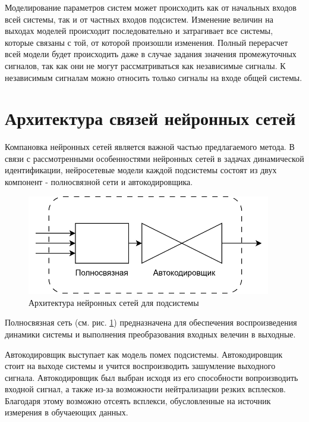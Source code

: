 Моделирование параметров систем может происходить как от начальных входов всей
системы, так и от частных входов подсистем. Изменение величин на выходах моделей
происходит последовательно и затрагивает все системы, которые связаны с той, от
которой произошли изменения. Полный перерасчет всей модели будет происходить
даже в случае задания значения промежуточных сигналов, так как они не могут
рассматриваться как независимые сигналы. К независимым сигналам можно относить
только сигналы на входе общей системы.

\section{Архитектура связей нейронных сетей}

Компановка нейронных сетей является важной частью предлагаемого метода. В связи
с рассмотренными особенностями нейронных сетей в задачах динамической
идентификации, нейросетевые модели каждой подсистемы состоят из двух компонент -
полносвязной сети и автокодировщика. 

\begin{figure}[H]
  \begin{center}
    \includegraphics[width=0.95\textwidth]{figures/nn_system.png}
  \end{center}
  \caption{Архитектура нейронных сетей для подсистемы}\label{fig:nn:system}
\end{figure}

Полносвязная сеть (см. рис. \ref{fig:nn:system}) предназначена для обеспечения
воспроизведения динамики системы и выполнения преобразования входных велечин в
выходные. 

Автокодировщик выступает как модель помех подсистемы. Автокодировщик стоит на
выходе системы и учится воспроизводить зашумление выходного сигнала.
Автокодировщик был выбран исходя из его способности вопроизводить входной
сигнал, а также из-за возможности нейтрализации резких всплесков. Благодаря
этому возможно отсеять всплекси, обусловленные на источник измерения в
обучаеющих данных. 


